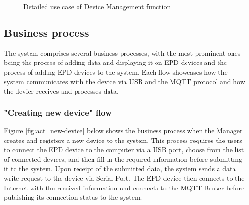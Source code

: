 \documentclass[../Main.tex]{subfiles}
\begin{document}
\begin{figure}[H]
    \centering
    \caption{Detailed use case of Device Management function}
    \label{fig:uc_device}
\end{figure}

\subsection{Business process}
\label{subsection:2.2.3}
The system comprises several business processes, with the most prominent ones being the process of adding data and displaying it on \gls{EPD} devices and the process of adding \gls{EPD} devices to the system. Each flow showcases how the system communicates with the device via USB and the MQTT protocol and how the device receives and processes data.

\subsubsection{"Creating new device" flow}
Figure \ref{fig:act_new-device} below shows the business process when the Manager creates and registers a new device to the system. This process requires the users to connect the \gls{EPD} device to the computer via a USB port, choose from the list of connected devices, and then fill in the required information before submitting it to the system. Upon receipt of the submitted data, the system sends a data write request to the device via Serial Port. The \gls{EPD} device then connects to the Internet with the received information and connects to the MQTT Broker before publishing its connection status to the system.
\end{document}
